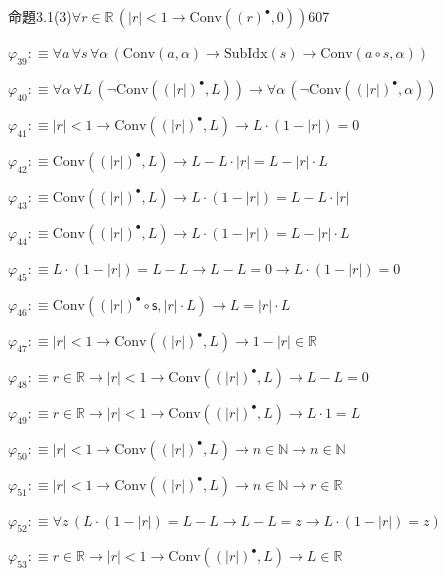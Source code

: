 \begin{fullproof}{命題3.1(3)}{$\forall r \in \mathbb{R}\,(\lvert r \rvert < 1 \to \mathrm{Conv}({(r)^{\bullet}},0))$}{607}
\begin{abbrevlist}
\item $\varphi_{39} :\equiv \forall a\,\forall s\,\forall \alpha\,(\mathrm{Conv}(a,\alpha) \to \mathrm{SubIdx}(s) \to \mathrm{Conv}(a \circ s,\alpha))$
\item $\varphi_{40} :\equiv \forall \alpha\,\forall L\,(\neg \mathrm{Conv}({(\lvert r \rvert)^{\bullet}},L)) \to \forall \alpha\,(\neg \mathrm{Conv}({(\lvert r \rvert)^{\bullet}},\alpha))$
\item $\varphi_{41} :\equiv \lvert r \rvert < 1 \to \mathrm{Conv}({(\lvert r \rvert)^{\bullet}},L) \to L \cdot (1 - \lvert r \rvert) = 0$
\item $\varphi_{42} :\equiv \mathrm{Conv}({(\lvert r \rvert)^{\bullet}},L) \to L - L \cdot \lvert r \rvert = L - \lvert r \rvert \cdot L$
\item $\varphi_{43} :\equiv \mathrm{Conv}({(\lvert r \rvert)^{\bullet}},L) \to L \cdot (1 - \lvert r \rvert) = L - L \cdot \lvert r \rvert$
\item $\varphi_{44} :\equiv \mathrm{Conv}({(\lvert r \rvert)^{\bullet}},L) \to L \cdot (1 - \lvert r \rvert) = L - \lvert r \rvert \cdot L$
\item $\varphi_{45} :\equiv L \cdot (1 - \lvert r \rvert) = L - L \to L - L = 0 \to L \cdot (1 - \lvert r \rvert) = 0$
\item $\varphi_{46} :\equiv \mathrm{Conv}({(\lvert r \rvert)^{\bullet}} \circ \mathsf{s},\lvert r \rvert \cdot L) \to L = \lvert r \rvert \cdot L$
\item $\varphi_{47} :\equiv \lvert r \rvert < 1 \to \mathrm{Conv}({(\lvert r \rvert)^{\bullet}},L) \to 1 - \lvert r \rvert \in \mathbb{R}$
\item $\varphi_{48} :\equiv r \in \mathbb{R} \to \lvert r \rvert < 1 \to \mathrm{Conv}({(\lvert r \rvert)^{\bullet}},L) \to L - L = 0$
\item $\varphi_{49} :\equiv r \in \mathbb{R} \to \lvert r \rvert < 1 \to \mathrm{Conv}({(\lvert r \rvert)^{\bullet}},L) \to L \cdot 1 = L$
\item $\varphi_{50} :\equiv \lvert r \rvert < 1 \to \mathrm{Conv}({(\lvert r \rvert)^{\bullet}},L) \to n \in \mathbb{N} \to n \in \mathbb{N}$
\item $\varphi_{51} :\equiv \lvert r \rvert < 1 \to \mathrm{Conv}({(\lvert r \rvert)^{\bullet}},L) \to n \in \mathbb{N} \to r \in \mathbb{R}$
\item $\varphi_{52} :\equiv \forall z\,(L \cdot (1 - \lvert r \rvert) = L - L \to L - L = z \to L \cdot (1 - \lvert r \rvert) = z)$
\item $\varphi_{53} :\equiv r \in \mathbb{R} \to \lvert r \rvert < 1 \to \mathrm{Conv}({(\lvert r \rvert)^{\bullet}},L) \to L \in \mathbb{R}$

\end{abbrevlist}
\end{fullproof}
